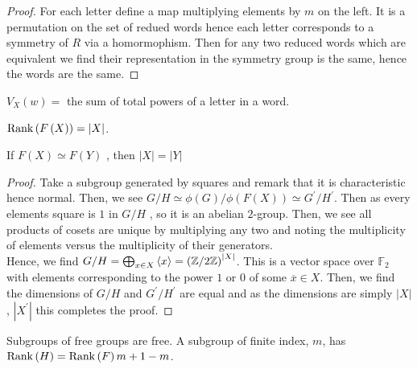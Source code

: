 \begin{proof}
	For each letter define a map multiplying elements by \(m\) on the left. It is a permutation on the set of redued words hence each letter corresponds to a symmetry of \(R\) via a homormophism. Then for any two reduced words which are equivalent we find their representation in the symmetry group is the same, hence the words are the same.
\end{proof}
\begin{definition}
	\(V_{X}\left( w \right) = \) the sum of total powers of a letter in a word.
\end{definition}
\begin{definition}
	\(\operatorname{Rank}\left( F\left( X \right)  \right) = \left| X \right| \).
\end{definition}
\begin{theorem}
	If \(F\left( X \right) \simeq F\left( Y \right) \) , then \(\left| X \right| = \left| Y \right|  \)
\end{theorem}
\begin{proof}
	Take a subgroup generated by squares and remark that it is characteristic hence normal. Then, we see \(G / H \simeq \phi\left( G \right) / \phi\left( F\left( X \right)  \right)  \simeq G^{\prime} / H^{\prime}\). Then as every elements square is \(1\) in \(G / H\) , so it is an abelian \(2\)-group. Then, we see all products of cosets are unique by multiplying any two and noting the multiplicity of elements versus the multiplicity of their generators.\\
	Hence, we find \(G / H = \bigoplus _{x \in X}\left<x \right> = \left( \mathbb{Z} / 2\mathbb{Z} \right)^{\left| X \right| }  \). This is a vector space over \(\mathbb{F}_2\) with elements corresponding to the power \(1\) or \(0\) of some \(\overline{x} \in X\). Then, we find the dimensions of \(G/ H\) and \(G^{\prime} / H^{\prime}\) are equal and as the dimensions are simply \(\left| X \right| \),   \(\left| X^{\prime} \right| \) this completes the proof.
\end{proof}
\begin{theorem}
	Subgroups of free groups are free.
	A subgroup of finite index, \(m\),  has \(\operatorname{Rank}\left( H \right)  = \operatorname{Rank}\left( F \right) m +1 - m\).
\end{theorem}

